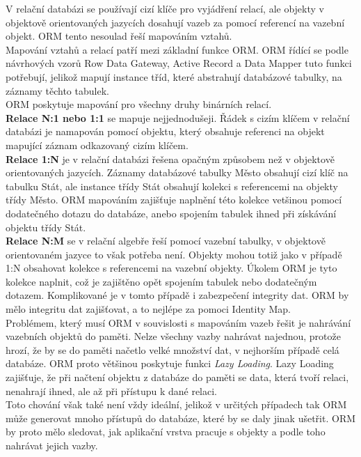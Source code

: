 \documentclass[ing,male,java,dept456]{diploma}						%
\begin{document}
V relační databázi se používají cizí klíče pro vyjádření relací, ale objekty v objektově orientovaných jazycích dosahují vazeb za pomocí referencí na vazební objekt. ORM tento nesoulad řeší mapováním vztahů.\\
Mapování vztahů a relací patří mezi základní funkce ORM. ORM řídící se podle návrhových vzorů Row Data Gateway, Active Record a Data Mapper tuto funkci potřebují, jelikož mapují instance tříd, které abstrahují databázové tabulky, na záznamy těchto tabulek. \\
ORM poskytuje mapování pro všechny druhy binárních relací. \\
\textbf{Relace N:1 nebo 1:1} se mapuje nejjednodušeji. Řádek s cizím klíčem v relační databázi je namapován pomocí objektu, který obsahuje referenci na objekt mapující záznam odkazovaný cizím klíčem. \\
\textbf{Relace 1:N} je v relační databázi řešena opačným způsobem než v objektově orientovaných jazycích. Záznamy databázové tabulky Město obsahují cizí klíč na tabulku Stát, ale instance třídy Stát obsahují kolekci s referencemi na objekty třídy Město. ORM mapováním zajišťuje naplnění této kolekce vetšinou pomocí dodatečného dotazu do databáze, anebo spojením tabulek ihned při získávání objektu třídy Stát. \\
\textbf{Relace N:M} se v relační algebře řeší pomocí vazební tabulky, v objektově orientovaném jazyce to však potřeba není. Objekty mohou totiž jako v případě 1:N obsahovat kolekce s referencemi na vazební objekty. Úkolem ORM je tyto kolekce naplnit, což je zajištěno opět spojením tabulek nebo dodatečným dotazem. Komplikované je v tomto případě i zabezpečení integrity dat. ORM by mělo integritu dat zajišťovat, a to nejlépe za pomoci Identity Map. \\
Problémem, který musí ORM v souvislosti s mapováním vazeb řešit je nahrávání vazebních objektů do paměti. Nelze všechny vazby nahrávat najednou, protože hrozí, že by se do paměti načetlo velké množství dat, v nejhorším případě celá databáze. ORM proto většinou poskytuje funkci \textit{Lazy Loading}. Lazy Loading zajišťuje, že při načtení objektu z databáze do paměti se data, která tvoří relaci, nenahrají ihned, ale až při přístupu k dané relaci. \\
Toto chování však také není vždy ideální, jelikož v určitých případech tak ORM může generovat mnoho přístupů do databáze, které by se daly jinak ušetřit. ORM by proto mělo sledovat, jak aplikační vrstva pracuje s objekty a podle toho nahrávat jejich vazby. 
\end{document}
